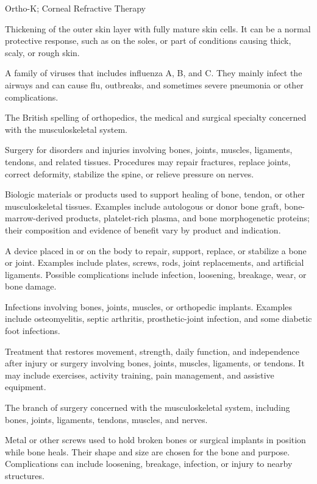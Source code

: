 \synonyms
Ortho-K; Corneal Refractive Therapy

 Thickening of the outer skin layer with fully mature skin cells. It can be a normal protective response, such as on the soles, or part of conditions causing thick, scaly, or rough skin.

 A family of viruses that includes influenza A, B, and C. They mainly infect the airways and can cause flu, outbreaks, and sometimes severe pneumonia or other complications.

 The British spelling of orthopedics, the medical and surgical specialty concerned with the musculoskeletal system.

 Surgery for disorders and injuries involving bones, joints, muscles, ligaments, tendons, and related tissues. Procedures may repair fractures, replace joints, correct deformity, stabilize the spine, or relieve pressure on nerves.

 Biologic materials or products used to support
healing of bone, tendon, or other musculoskeletal tissues. Examples include
autologous or donor bone graft, bone-marrow-derived products, platelet-rich plasma,
and bone morphogenetic proteins; their composition and evidence of benefit vary by
product and indication.

 A device placed in or on the body to repair, support, replace, or stabilize a bone or joint. Examples include plates, screws, rods, joint replacements, and artificial ligaments. Possible complications include infection, loosening, breakage, wear, or bone damage.

 Infections involving bones, joints, muscles, or orthopedic implants. Examples include osteomyelitis, septic arthritis,
prosthetic-joint infection, and some diabetic foot infections.

 Treatment that restores movement, strength, daily function, and independence after injury or surgery involving bones, joints, muscles, ligaments, or tendons. It may include exercises, activity training, pain management, and assistive equipment.

 The branch of surgery concerned with the musculoskeletal system, including bones,
joints, ligaments, tendons, muscles, and nerves.

 Metal or other screws used to hold broken bones or surgical implants in position while bone heals. Their shape and size are chosen for the bone and purpose. Complications can include loosening, breakage, infection, or injury to nearby structures.

